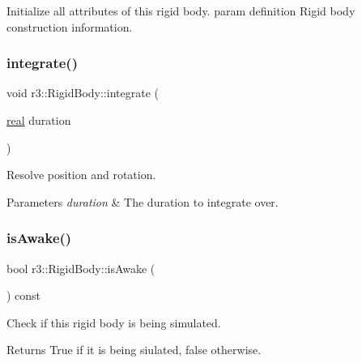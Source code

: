 Initialize all attributes of this rigid body. param definition Rigid body construction information. 

\mbox{\label{classr3_1_1_rigid_body_a16fd97f28e3d1c2308feb1c2e6b2e1f0}} 
\subsubsection{\texorpdfstring{integrate()}{integrate()}}
{\footnotesize\ttfamily void r3\+::\+Rigid\+Body\+::integrate (\begin{DoxyParamCaption}\item[{\mbox{\hyperlink{namespacer3_ab2016b3e3f743fb735afce242f0dc1eb}{real}}}]{duration }\end{DoxyParamCaption})\hspace{0.3cm}{\ttfamily [virtual]}}



Resolve position and rotation. 


\begin{DoxyParams}{Parameters}
{\em duration} & The duration to integrate over. \\
\hline
\end{DoxyParams}
\mbox{\label{classr3_1_1_rigid_body_a162bb9f31e5214001dabb1bdd94a9fbf}} 
\subsubsection{\texorpdfstring{is\+Awake()}{isAwake()}}
{\footnotesize\ttfamily bool r3\+::\+Rigid\+Body\+::is\+Awake (\begin{DoxyParamCaption}{ }\end{DoxyParamCaption}) const}



Check if this rigid body is being simulated. 

\begin{DoxyReturn}{Returns}
True if it is being siulated, false otherwise. 
\end{DoxyReturn}
\mbox{\label{classr3_1_1_rigid_body_add57880a9a4df0d016c1639eba48350d}} 
